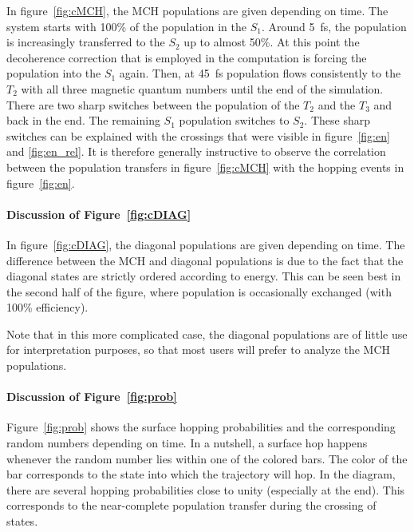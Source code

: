 \documentclass[a4paper,11pt,DIV=15,openany]{scrbook}
\begin{document}
In figure~\ref{fig:cMCH}, the MCH populations are given depending on time. 
The system starts with 100\% of the population in the $S_1$. 
Around 5~fs, the population is increasingly transferred to the $S_2$ up to almost 50\%. 
At this point the decoherence correction that is employed in the computation is forcing the population into the $S_1$ again.
Then, at 45~fs population flows consistently to the $T_2$ with all three magnetic quantum numbers until the end of the simulation. 
There are two sharp switches between the population of the $T_2$ and the $T_3$ and back in the end. 
The remaining $S_1$ population switches to $S_2$. These sharp switches can be explained with the crossings that were visible in figure~\ref{fig:en} and \ref{fig:en_rel}. 
It is therefore generally instructive to observe the correlation between the population transfers in figure~\ref{fig:cMCH} with the hopping events in figure~\ref{fig:en}.


\paragraph{Discussion of Figure~\ref{fig:cDIAG}}

In figure~\ref{fig:cDIAG}, the diagonal populations are given depending on time. 
The difference between the MCH and diagonal populations is due to the fact that the diagonal states are strictly ordered according to energy.
This can be seen best in the second half of the figure, where population is occasionally exchanged (with 100\% efficiency).

Note that in this more complicated case, the diagonal populations are of little use for interpretation purposes, so that most users will prefer to analyze the MCH populations.


\paragraph{Discussion of Figure~\ref{fig:prob}}

Figure~\ref{fig:prob} shows the surface hopping probabilities and the corresponding random numbers depending on time.
In a nutshell, a surface hop happens whenever the random number lies within one of the colored bars. 
The color of the bar corresponds to the state into which the trajectory will hop. 
In the diagram, there are several hopping probabilities close to unity (especially at the end). 
This corresponds to the near-complete population transfer during the crossing of states. 
\end{document}
